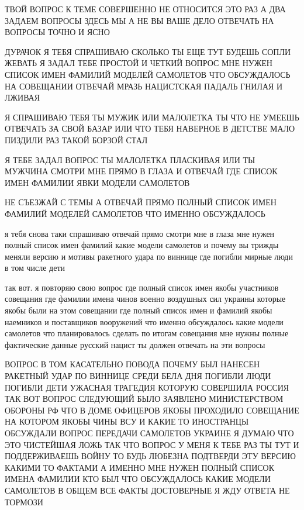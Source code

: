  
 
 
 
 

ТВОЙ ВОПРОС К ТЕМЕ СОВЕРШЕННО НЕ ОТНОСИТСЯ ЭТО РАЗ А ДВА ЗАДАЕМ ВОПРОСЫ ЗДЕСЬ
МЫ А НЕ ВЫ ВАШЕ ДЕЛО ОТВЕЧАТЬ НА ВОПРОСЫ ТОЧНО И ЯСНО

ДУРАЧОК Я ТЕБЯ СПРАШИВАЮ СКОЛЬКО ТЫ ЕЩЕ ТУТ БУДЕШЬ СОПЛИ ЖЕВАТЬ Я ЗАДАЛ ТЕБЕ
ПРОСТОЙ И ЧЕТКИЙ ВОПРОС МНЕ НУЖЕН СПИСОК ИМЕН ФАМИЛИЙ МОДЕЛЕЙ САМОЛЕТОВ ЧТО
ОБСУЖДАЛОСЬ НА СОВЕЩАНИИ ОТВЕЧАЙ МРАЗЬ НАЦИСТСКАЯ ПАДАЛЬ ГНИЛАЯ И ЛЖИВАЯ

Я СПРАШИВАЮ ТЕБЯ ТЫ МУЖИК ИЛИ МАЛОЛЕТКА ТЫ ЧТО НЕ УМЕЕШЬ ОТВЕЧАТЬ ЗА СВОЙ БАЗАР
ИЛИ ЧТО ТЕБЯ НАВЕРНОЕ В ДЕТСТВЕ МАЛО ПИЗДИЛИ РАЗ ТАКОЙ БОРЗОЙ СТАЛ

Я ТЕБЕ ЗАДАЛ ВОПРОС ТЫ МАЛОЛЕТКА ПЛАСКИВАЯ ИЛИ ТЫ МУЖЧИНА СМОТРИ МНЕ ПРЯМО В
ГЛАЗА И ОТВЕЧАЙ ГДЕ СПИСОК ИМЕН ФАМИЛИИ ЯВКИ МОДЕЛИ САМОЛЕТОВ

НЕ СЪЕЗЖАЙ С ТЕМЫ А ОТВЕЧАЙ ПРЯМО ПОЛНЫЙ СПИСОК ИМЕН ФАМИЛИЙ МОДЕЛЕЙ САМОЛЕТОВ
ЧТО ИМЕННО ОБСУЖДАЛОСЬ

я тебя снова таки спрашиваю отвечай прямо смотри мне в глаза мне нужен полный
список имен фамилий какие модели самолетов и почему вы трижды меняли версию и
мотивы ракетного удара по виннице где погибли мирные люди в том числе дети

так вот. я повторяю свою вопрос где полный список имен якобы участников
совещания где фамилии имена чинов военно воздушных сил украины которые якобы
были на этом совещании где полный список имен и фамилий якобы наемников и
поставщиков вооружений что именно обсуждалось какие модели самолетов что
планировалось сделать по итогам совещания мне нужны полные фактические данные
русский нацист ты должен отвечать на эти вопросы

ВОПРОС В ТОМ КАСАТЕЛЬНО ПОВОДА ПОЧЕМУ БЫЛ НАНЕСЕН РАКЕТНЫЙ УДАР ПО ВИННИЦЕ
СРЕДИ БЕЛА ДНЯ ПОГИБЛИ ЛЮДИ ПОГИБЛИ ДЕТИ УЖАСНАЯ ТРАГЕДИЯ КОТОРУЮ СОВЕРШИЛА
РОССИЯ ТАК ВОТ ВОПРОС СЛЕДУЮЩИЙ БЫЛО ЗАЯВЛЕНО МИНИСТЕРСТВОМ ОБОРОНЫ РФ ЧТО В
ДОМЕ ОФИЦЕРОВ ЯКОБЫ ПРОХОДИЛО СОВЕЩАНИЕ НА КОТОРОМ ЯКОБЫ ЧИНЫ ВСУ И КАКИЕ ТО
ИНОСТРАНЦЫ ОБСУЖДАЛИ ВОПРОС ПЕРЕДАЧИ САМОЛЕТОВ УКРАИНЕ Я ДУМАЮ ЧТО ЭТО
ЧИСТЕЙШАЯ ЛОЖЬ ТАК ЧТО ВОПРОС У МЕНЯ К ТЕБЕ РАЗ ТЫ ТУТ И ПОДДЕРЖИВАЕШЬ ВОЙНУ ТО
БУДЬ ЛЮБЕЗНА ПОДТВЕРДИ ЭТУ ВЕРСИЮ КАКИМИ ТО ФАКТАМИ А ИМЕННО МНЕ НУЖЕН ПОЛНЫЙ
СПИСОК ИМЕНА ФАМИЛИИ КТО БЫЛ ЧТО ОБСУЖДАЛОСЬ КАКИЕ МОДЕЛИ САМОЛЕТОВ В ОБЩЕМ ВСЕ
ФАКТЫ ДОСТОВЕРНЫЕ Я ЖДУ ОТВЕТА НЕ ТОРМОЗИ

